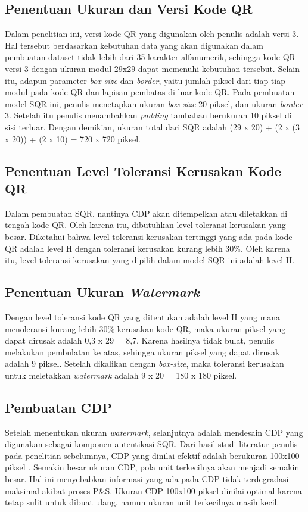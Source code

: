 \subsection{Penentuan Ukuran dan Versi Kode QR}
Dalam penelitian ini, versi kode QR yang digunakan oleh penulis adalah versi 3. Hal tersebut berdasarkan kebutuhan data yang akan digunakan dalam pembuatan
dataset tidak lebih dari 35 karakter alfanumerik, sehingga kode QR versi 3 dengan ukuran modul 29x29 dapat memenuhi kebutuhan tersebut. Selain itu, adapun
parameter \emph{box-size} dan \emph{border}, yaitu jumlah piksel dari tiap-tiap modul pada kode QR dan lapisan pembatas di luar kode QR. Pada pembuatan model
SQR ini, penulis menetapkan ukuran \emph{box-size} 20 piksel, dan ukuran \emph{border} 3. Setelah itu penulis menambahkan \emph{padding} tambahan berukuran 10
piksel di sisi terluar. Dengan demikian, ukuran total dari SQR adalah (29 x 20) + (2 x (3 x 20)) + (2 x 10) = 720 x 720 piksel.

\subsection{Penentuan Level Toleransi Kerusakan Kode QR}
Dalam pembuatan SQR, nantinya CDP akan ditempelkan atau diletakkan di tengah kode QR. Oleh karena itu, dibutuhkan level toleransi kerusakan yang besar.
Diketahui bahwa level toleransi kerusakan tertinggi yang ada pada kode QR adalah level H dengan toleransi kerusakan kurang lebih 30\%. Oleh karena itu, level
toleransi kerusakan yang dipilih dalam model SQR ini adalah level H.

\subsection{Penentuan Ukuran \emph{Watermark}}
Dengan level toleransi kode QR yang ditentukan adalah level H yang mana menoleransi kurang lebih 30\% kerusakan kode QR, maka ukuran piksel yang dapat dirusak adalah 0,3 x 29 = 8,7. Karena hasilnya tidak bulat, penulis melakukan pembulatan ke atas, sehingga ukuran piksel yang dapat dirusak adalah 9 piksel. Setelah dikalikan dengan \emph{box-size}, maka toleransi kerusakan untuk meletakkan \emph{watermark} adalah 9 x 20 = 180 x 180 piksel.

\subsection{Pembuatan CDP}
Setelah menentukan ukuran \emph{watermark}, selanjutnya adalah mendesain CDP yang digunakan sebagai komponen autentikasi SQR. Dari hasil studi literatur
penulis pada penelitian sebelumnya, CDP yang dinilai efektif adalah berukuran 100x100 piksel \cite{PICARDCANCOPYDETECTIONPATTERN}. Semakin besar ukuran CDP,
pola unit terkecilnya akan menjadi semakin besar. Hal ini menyebabkan informasi yang ada pada CDP tidak terdegradasi maksimal akibat proses P\&S. Ukuran CDP
100x100 piksel dinilai optimal karena tetap sulit untuk dibuat ulang, namun ukuran unit terkecilnya masih kecil.


